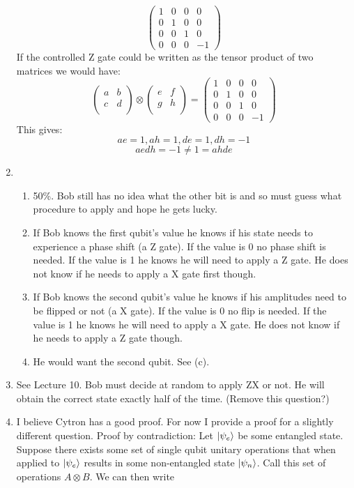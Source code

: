 \documentclass[12pt]{article}
\begin{document}
\begin{enumerate}[font=\bfseries]
    \[\begin{pmatrix}
    1 & 0 & 0 & 0 \\
    0 & 1 & 0 & 0 \\
    0 & 0 & 1 & 0 \\
    0 & 0 & 0 & -1
    \end{pmatrix}
    \]
    If the controlled Z gate could be written as the tensor product of two matrices we would have:
    \[
    \begin{pmatrix}
    a & b  \\
    c & d  \\
    \end{pmatrix}
    \otimes
    \begin{pmatrix}
    e & f  \\
    g & h  \\
    \end{pmatrix}
    =
    \begin{pmatrix}
    1 & 0 & 0 & 0 \\
    0 & 1 & 0 & 0 \\
    0 & 0 & 1 & 0 \\
    0 & 0 & 0 & -1
    \end{pmatrix}
    \]
    This gives:
    \[ae = 1, ah = 1, de = 1, dh = -1\]
    \[aedh = -1 \neq 1 = ahde\]
    \item \begin{enumerate}
        \item 50\%. Bob still has no idea what the other bit is and so must guess what procedure to apply and hope he gets lucky.
        \item If Bob knows the first qubit's value he knows if his state needs to experience a phase shift (a Z gate). If the value is 0 no phase shift is needed. If the value is 1 he knows he will need to apply a Z gate. He does not know if he needs to apply a X gate first though.
        \item If Bob knows the second qubit's value he knows if his amplitudes need to be flipped or not (a X gate). If the value is 0 no flip is needed. If the value is 1 he knows he will need to apply a X gate. He does not know if he needs to apply a Z gate though.
        \item He would want the second qubit. See (c).
    \end{enumerate}
    \item See Lecture 10. Bob must decide at random to apply ZX or not. He will obtain the correct state exactly half of the time. (Remove this question?)
    \item I believe Cytron has a good proof. For now I provide a proof for a slightly different question. Proof by contradiction: Let $\ket{\psi_e}$ be some entangled state. Suppose there exists some set of single qubit unitary operations that when applied to $\ket{\psi_e}$ results in some non-entangled state $\ket{\psi_n}$. Call this set of operations $A \otimes B$. We can then write

\end{enumerate}
\end{document}
